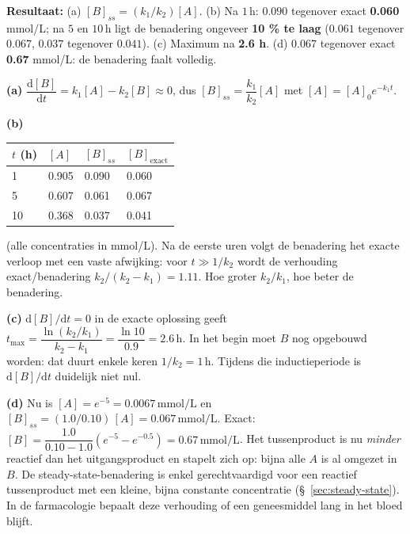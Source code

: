 \begin{oplossing}
\textbf{Resultaat:} (a) \([B]_{ss} = (k_1/k_2)[A]\). (b) Na \(1\,\mathrm{h}\): \(0.090\) tegenover exact \textbf{0.060} mmol/L; na \(5\) en \(10\,\mathrm{h}\) ligt de benadering ongeveer \textbf{10 \% te laag} (\(0.061\) tegenover \(0.067\), \(0.037\) tegenover \(0.041\)). (c) Maximum na \textbf{2.6 h}. (d) \(0.067\) tegenover exact \textbf{0.67} mmol/L: de benadering faalt volledig.

\textbf{(a)} \(\dfrac{\mathrm{d}[B]}{\mathrm{d}t} = k_1[A] - k_2[B] \approx 0\), dus \([B]_{ss} = \dfrac{k_1}{k_2}[A]\) met \([A] = [A]_0e^{-k_1t}\).

\textbf{(b)}

\begin{center}
\begin{tabular}{llll}
\toprule
\(t\) (h) & \([A]\) & \([B]_{ss}\) & \([B]_{\text{exact}}\) \\
\midrule
1 & 0.905 & 0.090 & 0.060 \\
5 & 0.607 & 0.061 & 0.067 \\
10 & 0.368 & 0.037 & 0.041 \\
\bottomrule
\end{tabular}
\end{center}

(alle concentraties in mmol/L). Na de eerste uren volgt de benadering het exacte verloop met een vaste afwijking: voor \(t \gg 1/k_2\) wordt de verhouding exact/benadering \(k_2/(k_2 - k_1) = 1.11\). Hoe groter \(k_2/k_1\), hoe beter de benadering.

\textbf{(c)} \(\mathrm{d}[B]/\mathrm{d}t = 0\) in de exacte oplossing geeft \(t_{\max} = \dfrac{\ln(k_2/k_1)}{k_2 - k_1} = \dfrac{\ln 10}{0.9} = 2.6\,\mathrm{h}\). In het begin moet \(B\) nog opgebouwd worden: dat duurt enkele keren \(1/k_2 = 1\,\mathrm{h}\). Tijdens die inductieperiode is \(\mathrm{d}[B]/\mathrm{d}t\) duidelijk niet nul.

\textbf{(d)} Nu is \([A] = e^{-5} = 0.0067\,\mathrm{mmol/L}\) en \([B]_{ss} = (1.0/0.10)\,[A] = 0.067\,\mathrm{mmol/L}\). Exact: \([B] = \dfrac{1.0}{0.10 - 1.0}(e^{-5} - e^{-0.5}) = 0.67\,\mathrm{mmol/L}\). Het tussenproduct is nu \emph{minder} reactief dan het uitgangsproduct en stapelt zich op: bijna alle \(A\) is al omgezet in \(B\). De steady-state-benadering is enkel gerechtvaardigd voor een reactief tussenproduct met een kleine, bijna constante concentratie (\S~\ref{sec:steady-state}). In de farmacologie bepaalt deze verhouding of een geneesmiddel lang in het bloed blijft.
\end{oplossing}

